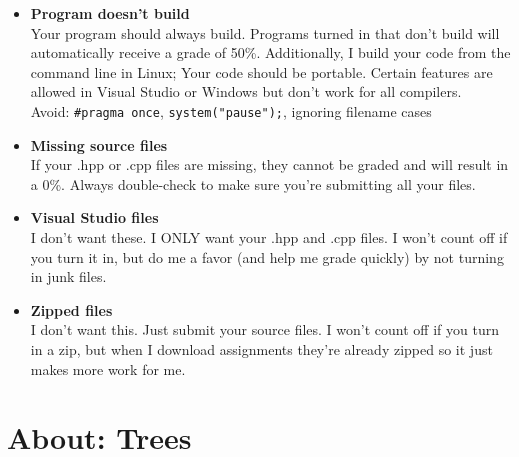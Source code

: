 \documentclass[a4paper,12pt,oneside]{book}
\begin{document}
                \begin{itemize}
                    \item   \textbf{Program doesn't build}
                        \\ Your program should always build. Programs turned in that don't build will automatically receive a grade of 50\%.{}
                            Additionally, I build your code from the command line in Linux; Your code should be portable. Certain features
                            are allowed in Visual Studio or Windows but don't work for all compilers. \\
                            \footnotesize Avoid: \texttt{\#pragma once}, \texttt{system("pause");}, ignoring filename cases
                            \normalsize 
                    \item   \textbf{Missing source files}
                        \\ If your .hpp or .cpp files are missing, they cannot be graded and will result in a 0\%. Always double-check to make sure you're submitting all your files.
                    \item   \textbf{Visual Studio files}
                        \\ I don't want these. I ONLY want your .hpp and .cpp files. I won't count off if you turn it in, but do me a favor (and help me grade quickly) by not turning in junk files.
                    \item   \textbf{Zipped files}
                        \\ I don't want this. Just submit your source files. I won't count off if you turn in a zip, but when I download assignments they're already zipped so it just makes more work for me.
                \end{itemize}

        



\tableofcontents


\section{About: Trees}
\end{document}

